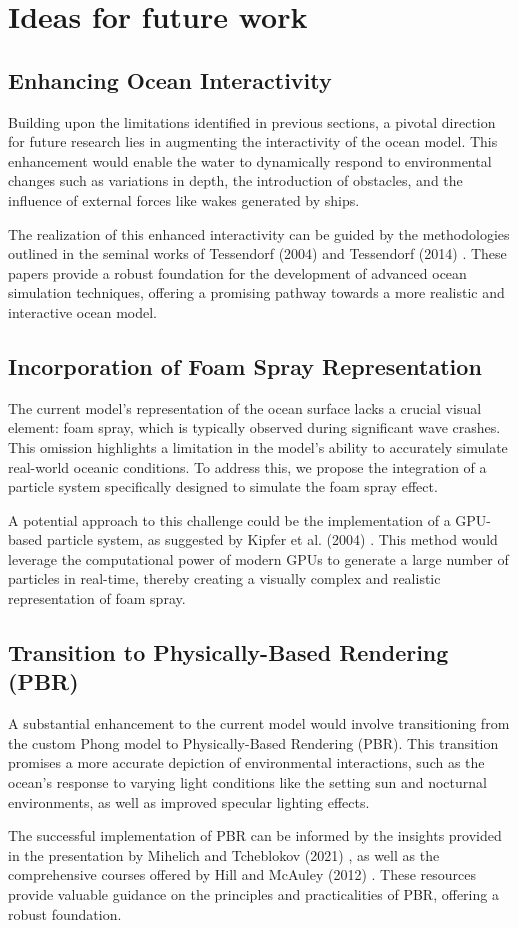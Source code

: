 \section{Ideas for future work}
\subsection{Enhancing Ocean Interactivity} 
Building upon the limitations identified in previous sections, a pivotal direction for future research lies in augmenting the interactivity of the ocean model. This enhancement would enable the water to dynamically respond to environmental changes such as variations in depth, the introduction of obstacles, and the influence of external forces like wakes generated by ships. 

The realization of this enhanced interactivity can be guided by the methodologies outlined in the seminal works of Tessendorf (2004) \cite{tessendorf2004} and Tessendorf (2014) \cite{tessendorf2014}. These papers provide a robust foundation for the development of advanced ocean simulation techniques, offering a promising pathway towards a more realistic and interactive ocean model.
\subsection{Incorporation of Foam Spray Representation} 
The current model's representation of the ocean surface lacks a crucial visual element: foam spray, which is typically observed during significant wave crashes. This omission highlights a limitation in the model's ability to accurately simulate real-world oceanic conditions. To address this, we propose the integration of a particle system specifically designed to simulate the foam spray effect.

A potential approach to this challenge could be the implementation of a GPU-based particle system, as suggested by Kipfer et al. (2004) \cite{kipfer2004}. This method would leverage the computational power of modern GPUs to generate a large number of particles in real-time, thereby creating a visually complex and realistic representation of foam spray.

\subsection{Transition to Physically-Based Rendering (PBR)} 
A substantial enhancement to the current model would involve transitioning from the custom Phong model to Physically-Based Rendering (PBR). This transition promises a more accurate depiction of environmental interactions, such as the ocean's response to varying light conditions like the setting sun and nocturnal environments, as well as improved specular lighting effects.

The successful implementation of PBR can be informed by the insights provided in the presentation by Mihelich and Tcheblokov (2021) \cite{mark2021}, as well as the comprehensive courses offered by Hill and McAuley (2012) \cite{stephan2012}. These resources provide valuable guidance on the principles and practicalities of PBR, offering a robust foundation.